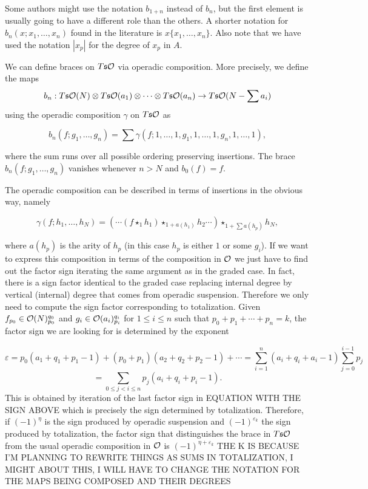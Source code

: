 \documentclass[twoside]{article}
\begin{document}
\begin{remark}
Some authors might use the notation $b_{1+n}$ instead of $b_n$, but the first element is usually going to have a different role than the others. A shorter notation for $b_n(x;x_1,\dots,x_n)$ found in the literature is $x\{x_1,\dots, x_n\}$. Also note that we have used the notation $|x_p|$ for the degree of $x_p$ in $A$. 
\end{remark}

We can define braces on $T\mathfrak{s}{\mathcal O}$ via operadic composition. More precisely, we define the maps 
$$b_n:T\mathfrak{s}{\mathcal O}(N)\otimes T\mathfrak{s}{\mathcal O}(a_1)\otimes\cdots\otimes T\mathfrak{s}{\mathcal O}(a_n)\to T\mathfrak{s}{\mathcal O}(N-\sum a_i)$$
using the operadic composition $\gamma$ on $T\mathfrak{s}{\mathcal O}$ as

\[b_n(f;g_1,\dots,g_n)=\sum\gamma(f;1,\dots,1,g_1,1,\dots,1,g_n,1,\dots,1),\]

where the sum runs over all possible ordering preserving insertions. The brace $b_n(f;g_1,\dots,g_n)$ vanishes whenever $n>N$ and $b_0(f)=f$.

The operadic composition can be described in terms of insertions in the obvious way, namely 

$$\gamma(f;h_1,\dots, h_N)=(\cdots(f\star_1 h_1)\star_{1+a(h_1)}h_2\cdots)\star_{1+\sum a(h_p)}h_N,$$

where $a(h_p)$ is the arity of $h_p$ (in this case $h_p$ is either $1$ or some $g_i$). If we want to express this composition in terms of the composition in ${\mathcal O}$ we just have to find out the factor sign iterating the same argument as in the graded case. In fact, there is a sign factor identical to the graded case replacing internal degree by vertical (internal) degree that comes from operadic suspension. Therefore we only need to compute the sign factor corresponding to totalization. Given $f_{p_0}\in {\mathcal O}(N)^{q_0}_{p_0}$ and  $g_i\in{\mathcal O}(a_i)^{q_i}_{p_i}$ for $1\leq i\leq n$ such that $p_0+p_1+\cdots+p_n=k$, the factor sign we are looking for is determined by the exponent


\[\varepsilon
=p_0(a_1+q_1+p_1-1)+(p_0+p_1)(a_2+q_2+p_2-1)+\cdots=\sum_{i=1}^n(a_i+q_i+a_i-1)\sum_{j=0}^{i-1}p_j\]\[=\sum_{0\leq j<i\leq n}p_j(a_i+q_i+p_i-1).\]
This is obtained by iteration of the last factor sign in EQUATION WITH THE SIGN ABOVE which is precisely the sign determined by totalization. Therefore, if $(-1)^\eta$ is the sign produced by operadic suspension and $(-1)^{\varepsilon_k}$ the sign produced by totalization, the factor sign that distinguishes the brace in $T\mathfrak{s}{\mathcal O}$ from the usual operadic composition in ${\mathcal O}$ is $(-1)^{\eta+\varepsilon_k}$ THE K IS BECAUSE I'M PLANNING TO REWRITE THINGS AS SUMS IN TOTALIZATION, I MIGHT ABOUT THIS, I WILL HAVE TO CHANGE THE NOTATION FOR THE MAPS BEING COMPOSED AND THEIR DEGREES
\end{document}
